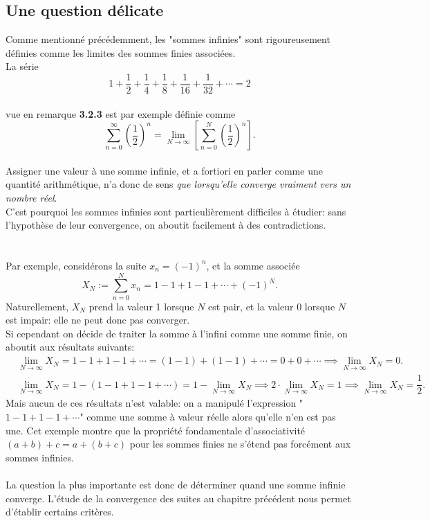 \documentclass[oneside,11pt,french,table]{book}
\theoremstyle{definition}
\theoremstyle{plain}
\theoremstyle{remark}
\begin{document}
\subsection{Une question délicate}
Comme mentionné précédemment, les "sommes infinies" sont rigoureusement définies comme les limites des sommes finies associées. \\
La série
$$ 1 + \dfrac{1}{2} + \dfrac{1}{4} + \dfrac{1}{8} + \dfrac{1}{16} + \dfrac{1}{32} + \cdots = 2$$ \\
vue en remarque \textbf{3.2.3} est par exemple définie comme
$$\sum_{n=0}^{\infty} \left( \dfrac{1}{2} \right) ^n = \lim_{N \to \infty} \left[ \sum_{n=0}^N \left( \dfrac{1}{2} \right) ^n \right].$$ \\
Assigner une valeur à une somme infinie, et a fortiori en parler comme une quantité arithmétique, n'a donc de sens \textit{que lorsqu'elle converge vraiment vers un nombre réel}. \\
C'est pourquoi les sommes infinies sont particulièrement difficiles à étudier: sans l'hypothèse de leur convergence, on aboutit facilement à des contradictions. \\
\\ \\
Par exemple, considérons la suite $x_n = (-1)^n$, et la somme associée
$$X_N := \sum_{n=0}^N x_n = 1 - 1 + 1 - 1 + \cdots + (-1)^N.$$
Naturellement, $X_N$ prend la valeur 1 lorsque $N$ est pair, et la valeur 0 lorsque $N$ est impair: elle ne peut donc pas converger. \\
Si cependant on décide de traiter la somme à l'infini comme une somme finie, on aboutit aux résultats suivants:
\begin{align*}
&\lim\limits_{N \to \infty} X_N = 1 - 1 + 1 - 1 + \cdots = (1-1) + (1-1) + \cdots = 0 + 0 + \cdots \implies \lim\limits_{N \to \infty} X_N = 0. \\
&\lim\limits_{N \to \infty} X_N = 1 - (1-1+1-1+ \cdots) = 1 - \lim\limits_{N \to \infty} X_N \implies 2 \cdot \lim\limits_{N \to \infty} X_N = 1 \implies \lim\limits_{N \to \infty} X_N = \dfrac{1}{2}.
\end{align*}
Mais aucun de ces résultats n'est valable: on a manipulé l'expression "$1-1+1-1+ \cdots$" comme une somme à valeur réelle alors qu'elle n'en est pas une. Cet exemple montre que la propriété fondamentale d'associativité $(a+b)+c = a+(b+c)$ pour les sommes finies ne s'étend pas forcément aux sommes infinies. \\
\\
La question la plus importante est donc de déterminer quand une somme infinie converge. L'étude de la convergence des suites au chapitre précédent nous permet d'établir certains critères.
\end{document}
